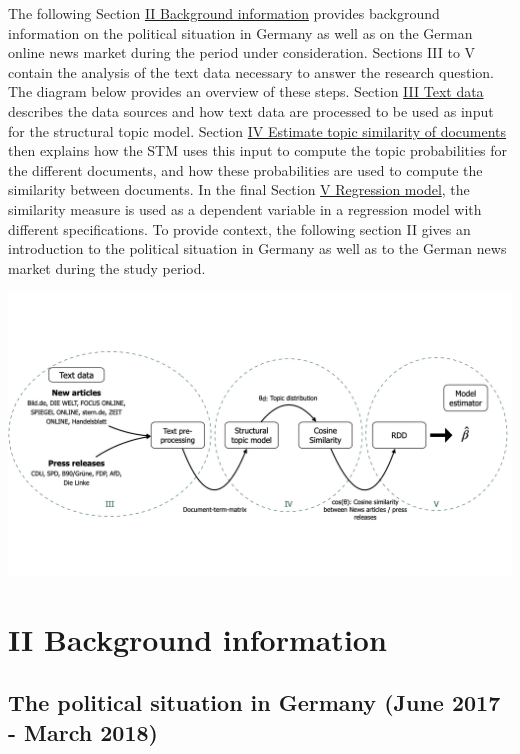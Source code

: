 \documentclass[
]{article}
\begin{document}
The following Section \protect\hyperlink{ii-background-information}{II
Background information} provides background information on the political
situation in Germany as well as on the German online news market during
the period under consideration. Sections III to V contain the analysis
of the text data necessary to answer the research question. The diagram
below provides an overview of these steps. Section
\protect\hyperlink{iii-text-data}{III Text data} describes the data
sources and how text data are processed to be used as input for the
structural topic model. Section
\protect\hyperlink{iv-estimate-topic-similarity-of-documents}{IV
Estimate topic similarity of documents} then explains how the STM uses
this input to compute the topic probabilities for the different
documents, and how these probabilities are used to compute the
similarity between documents. In the final Section
\protect\hyperlink{v-regression-model}{V Regression model}, the
similarity measure is used as a dependent variable in a regression model
with different specifications. To provide context, the following section
II gives an introduction to the political situation in Germany as well
as to the German news market during the study period.

\includegraphics{../figs/high_level_overview.png}

\hypertarget{ii-background-information}{%
\section{II Background information}\label{ii-background-information}}

\hypertarget{the-political-situation-in-germany-june-2017---march-2018}{%
\subsection{The political situation in Germany (June 2017 - March
2018)}\label{the-political-situation-in-germany-june-2017---march-2018}}
\end{document}
